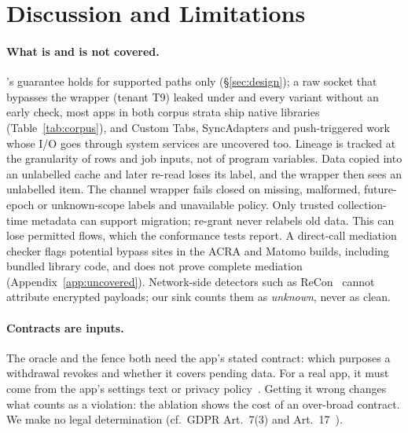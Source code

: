 \section{Discussion and Limitations}
\label{sec:discussion}
\label{sec:threats}

\paragraph{What is and is not covered.} \sys's guarantee holds for supported paths only (\S\ref{sec:design}); a raw
socket that bypasses the wrapper (tenant T9) leaked under \sys and every variant without an early check, most apps in
both corpus strata ship native libraries (Table~\ref{tab:corpus}), and Custom Tabs, SyncAdapters and push-triggered work
whose I/O goes through system services are uncovered too.
Lineage is tracked at the granularity of rows and job inputs, not of program variables. Data copied into an unlabelled
cache and later re-read loses its label, and the wrapper then sees an unlabelled item. The channel wrapper fails closed on missing, malformed,
future-epoch or unknown-scope labels and unavailable policy. Only trusted collection-time metadata
can support migration; re-grant never relabels old data. This can lose permitted flows, which the
conformance tests report. A direct-call mediation checker flags potential bypass sites in the ACRA and Matomo builds, including bundled library code, and does not prove complete mediation (Appendix~\ref{app:uncovered}). Network-side detectors such as ReCon~\cite{ren2016recon} cannot attribute encrypted payloads; our sink counts them as
\emph{unknown}, never as clean.

\paragraph{Contracts are inputs.} The oracle and the fence both need the app's stated contract: which purposes a withdrawal
revokes and whether it covers pending data. For a real app, it must come from the app's settings
text or privacy policy~\cite{andow2019policylint,zimmeck2019maps}. Getting it wrong changes what counts as a violation: the
 ablation shows the cost of an over-broad contract.
We make no legal determination (cf.~GDPR Art.~7(3) and Art.~17~\cite{gdpr2016}).

